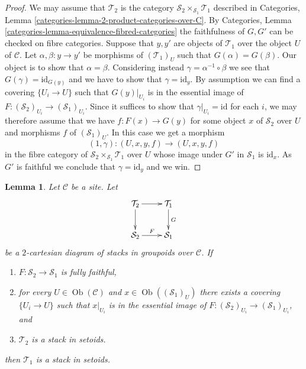 \documentclass{stacks-project}
\theoremstyle{plain}
\newtheorem{lemma}[subsection]{Lemma}
\theoremstyle{definition}
\theoremstyle{remark}
\numberwithin{equation}{subsection}
\def\Ob{\mathop{\mathrm{Ob}}\nolimits}
\begin{document}
\begin{proof}
We may assume that $\mathcal{T}_2$ is the category
$\mathcal{S}_2 \times_{\mathcal{S}_1} \mathcal{T}_1$
described in
Categories, Lemma \ref{categories-lemma-2-product-categories-over-C}.
By
Categories, Lemma \ref{categories-lemma-equivalence-fibred-categories}
the faithfulness of $G, G'$ can be checked on fibre categories.
Suppose that $y, y'$ are objects of $\mathcal{T}_1$ over the object $U$
of $\mathcal{C}$. Let $\alpha, \beta : y \to y'$ be morphisms of
$(\mathcal{T}_1)_U$ such that $G(\alpha) = G(\beta)$. Our object is to
show that $\alpha = \beta$. Considering instead
$\gamma = \alpha^{-1} \circ \beta$ we see that $G(\gamma) = \text{id}_{G(y)}$
and we have to show that $\gamma = \text{id}_y$. By assumption we
can find a covering $\{U_i \to U\}$ such that $G(y)|_{U_i}$ is in the
essential image of $F :(\mathcal{S}_2)_{U_i} \to (\mathcal{S}_1)_{U_i}$.
Since it suffices to show that $\gamma|_{U_i} = \text{id}$ for each $i$,
we may therefore assume that we have
$f : F(x) \to G(y)$ for some object $x$ of $\mathcal{S}_2$ over $U$
and morphisms $f$ of $(\mathcal{S}_1)_U$. In this case we get
a morphism
$$
(1, \gamma) : (U, x, y, f) \longrightarrow (U, x, y, f)
$$
in the fibre category of $\mathcal{S}_2 \times_{\mathcal{S}_1} \mathcal{T}_1$
over $U$ whose image under $G'$ in $\mathcal{S}_1$ is $\text{id}_x$.
As $G'$ is faithful we conclude that $\gamma = \text{id}_y$ and we win.
\end{proof}

\begin{lemma}
\label{lemma-stack-in-setoids-descent}
Let $\mathcal{C}$ be a site.
Let
$$
\xymatrix{
\mathcal{T}_2 \ar[r] \ar[d] & \mathcal{T}_1 \ar[d]^G \\
\mathcal{S}_2 \ar[r]^F & \mathcal{S}_1
}
$$
be a $2$-cartesian diagram of stacks in groupoids over $\mathcal{C}$.
If
\begin{enumerate}
\item $F : \mathcal{S}_2 \to \mathcal{S}_1$ is fully faithful,
\item for every $U \in \Ob(\mathcal{C})$ and
$x \in \Ob((\mathcal{S}_1)_U)$ there exists a covering
$\{U_i \to U\}$ such that $x|_{U_i}$ is in the essential
image of $F : (\mathcal{S}_2)_{U_i} \to (\mathcal{S}_1)_{U_i}$, and
\item $\mathcal{T}_2$ is a stack in setoids.
\end{enumerate}
then $\mathcal{T}_1$ is a stack in setoids.
\end{lemma}
\end{document}
